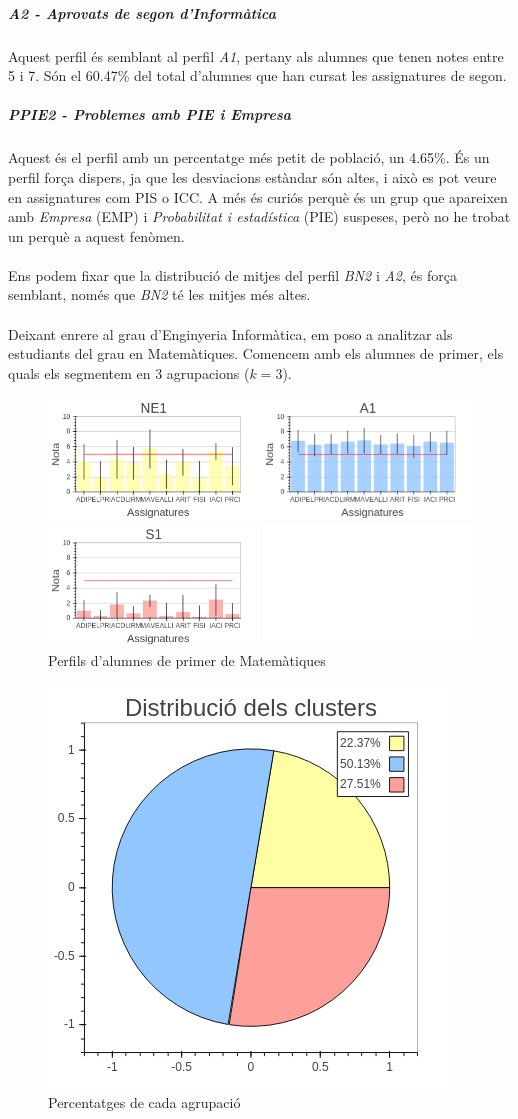 \documentclass[12pt,a4paper,catalan]{article}
\begin{document}
\subparagraph{A2 - Aprovats de segon d'Informàtica}
Aquest perfil és semblant al perfil \textit{A1}, pertany als alumnes que tenen notes entre 5 i 7. Són el 60.47\% del total d'alumnes que han cursat les assignatures de segon.

\subparagraph{PPIE2 - Problemes amb PIE i Empresa}
Aquest és el perfil amb un percentatge més petit de població, un 4.65\%. És un perfil força dispers, ja que les desviacions estàndar són altes, i això es pot veure en assignatures com PIS o ICC. A més és curiós perquè és un grup que apareixen amb \textit{Empresa} (EMP) i \textit{Probabilitat i estadística} (PIE) suspeses, però no he trobat un perquè a aquest fenòmen.
\\
\\
Ens podem fixar que la distribució de mitjes del perfil \textit{BN2} i \textit{A2}, és força semblant, només que \textit{BN2} té les mitjes més altes.
\\
\\
Deixant enrere al grau d'Enginyeria Informàtica, em poso a analitzar als estudiants del grau en Matemàtiques. Comencem amb els alumnes de primer, els quals els segmentem en 3 agrupacions ($k=3$).

\newpage

\begin{figure}[h]
\centering
\includegraphics[width=.9\linewidth]{img/perfils_primer_mates.png}
\caption{Perfils d'alumnes de primer de Matemàtiques}
\end{figure}

\begin{figure}[h]
\centering
\includegraphics[width=.4\linewidth]{img/perfils_primer_mates_pastilla.png}
\caption{Percentatges de cada agrupació}
\end{figure}
\end{document}
